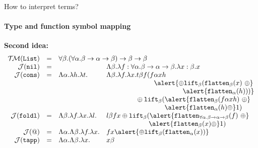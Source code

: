 \documentclass[10pt,presentation,color=names]{beamer}
\newcommand{\arrtype}{\rightarrow}
\newcommand{\quant}[2]{\forall #1.#2}
\newcommand{\abs}[2]{\lambda #1.#2}
\newcommand{\flatten}{\mathtt{flatten}}
\newcommand{\lift}{\mathtt{lift}}
\newcommand{\Typemap}{\mathcal{T\!M}}
\newcommand{\Termmap}{\mathcal{J}}
\newcommand{\List}{\mathtt{List}}
\begin{document}
\begin{frame}{How to interpret terms?}
  \framesubtitle{Type and function symbol mapping}
  \textbf{Second idea:}
  \[
  \begin{array}{rcll}
    \Typemap(\List) & = & \multicolumn{2}{l}{
      \quant{\beta}{(\quant{\alpha}{\beta \arrtype
      \alpha \arrtype \beta}) \arrtype \beta \arrtype \beta}}\\
  \Termmap(\mathtt{nil}) & = & & \Lambda \beta.\lambda f : \forall\alpha.\beta\to\alpha\to\beta.\abs{x:\beta}{x} \\
  \Termmap(\mathtt{cons}) & = & \Lambda \alpha.\lambda h.\lambda t. &
    \Lambda \beta.\lambda f.\lambda x.
    t \beta f (f \alpha x h \\
    & & & \phantom{ABCDEFGHI}\alert{\oplus \lift_\beta(\flatten_\beta(x)\
    \oplus} \\
    & & & \phantom{ABCDEFGHIJKLMN} \alert{\flatten_\alpha(h)))} \\
    & & & \phantom{ABCDE\ }\oplus
    \lift_\beta(\alert{\flatten_\beta(f\alpha x h)\ \oplus} \\
    & & & \phantom{ABCDEFGHIJK}\alert{
    \flatten_\alpha(h) \oplus} 1) \\
  \Termmap(\mathtt{foldl}) & = & \Lambda \beta.\lambda f. \lambda x.
    \lambda l. & l \beta f x \oplus \lift_\beta(\alert{\flatten_{\forall \alpha.
    \beta \arrtype \alpha \arrtype \beta}(f)\ \oplus} \\
    & & & \phantom{ABCDEFG\ \ }
    \alert{\flatten_\beta(x) \oplus} 1) \\
  \Termmap(\mathtt{@}) & = & \Lambda \alpha.\Lambda\beta.
    \lambda f.\lambda x. &
    f x \alert{\oplus \lift_\beta(\flatten_\alpha(x))} \\
  \Termmap(\mathtt{tapp}) & = & \Lambda \alpha.\Lambda \beta.\lambda x. &
    x \beta \\
  \end{array}
  \]


\end{frame}
\end{document}
